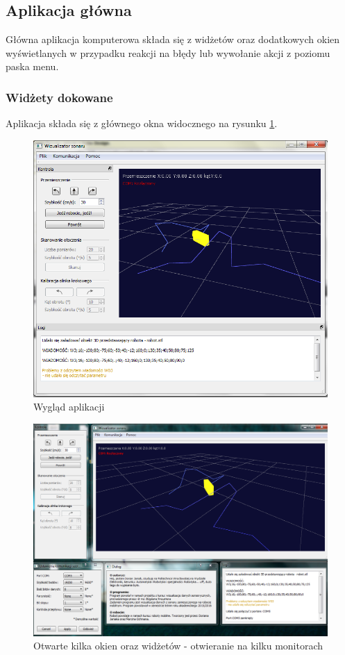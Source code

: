 \documentclass[a4paper,12pt]{article}
\begin{document}
\subsection{Aplikacja główna}
Główna aplikacja komputerowa składa się z widżetów oraz dodatkowych okien wyświetlanych w przypadku reakcji na błędy lub wywołanie akcji z poziomu paska menu.
\subsubsection{Widżety dokowane}
Aplikacja składa się z głównego okna widocznego na rysunku \ref{app2}.
\begin{figure}
\centering
\includegraphics[width=\linewidth]{app2.png}
\caption{Wygląd aplikacji}
\label{app2}
\end{figure}
\begin{figure}[p]
\centering
\includegraphics[width=\textheight, angle=90]{app5.png}
\caption{Otwarte kilka okien oraz widżetów - otwieranie na kilku monitorach}
\label{app5}
\end{figure}
\end{document}
